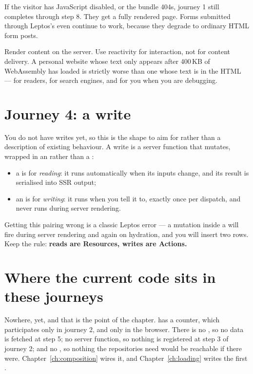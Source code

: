 If the visitor has JavaScript disabled, or the bundle 404s, journey 1 still completes through
step 8. They get a fully rendered page. Forms submitted through Leptos's  even
continue to work, because they degrade to ordinary HTML form posts.

\begin{pattern}
Render content on the server. Use reactivity for interaction, not for content delivery. A personal
website whose text only appears after 400\,KB of WebAssembly has loaded is strictly worse than one
whose text is in the HTML --- for readers, for search engines, and for you when you are debugging.
\end{pattern}

\section{Journey 4: a write}

You do not have writes yet, so this is the shape to aim for rather than a description of
existing behaviour. A write is a server function that mutates, wrapped in an  rather
than a :

\begin{itemize}
  \item a  is for \emph{reading}: it runs automatically when its inputs change, and
    its result is serialised into SSR output;
  \item an  is for \emph{writing}: it runs when you tell it to, exactly once per
    dispatch, and never runs during server rendering.
\end{itemize}

Getting this pairing wrong is a classic Leptos error --- a mutation inside a  will
fire during server rendering and again on hydration, and you will insert two rows. Keep the rule:
\textbf{reads are Resources, writes are Actions.}

\section{Where the current code sits in these journeys}

Nowhere, yet, and that is the point of the chapter.  has a 
counter, which participates only in journey 2, and only in the browser. There is no
, so no data is fetched at step 5; no server function, so nothing is registered at
step 3 of journey 2; and no , so nothing the repositories need would be
reachable if there were. Chapter~\ref{ch:composition} wires it, and
Chapter~\ref{ch:loading} writes the first .

